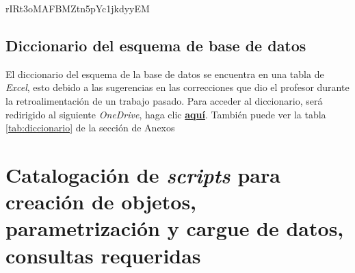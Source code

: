 \documentclass{article}
\begin{document}
rIRt3oMAFBMZtn5pYc1jkdyyEM%




\subsection{Diccionario del esquema de base de datos}
El diccionario del esquema de la base de datos se encuentra en una tabla de \textit{Excel}, esto debido a las sugerencias en las correcciones que dio el profesor durante la retroalimentación de un trabajo pasado. Para acceder al diccionario, será redirigido al siguiente \textit{OneDrive}, haga clic \href{https://utadeoeduco0-my.sharepoint.com/:x:/g/personal/ludwig_alvaradob_utadeo_edu_co/ESnNN_S9m3lLjRuBV98TBJ8BtNiuxTNsBHEWiHHNZ142qQ?e=Mcr9HD}{\textbf{aquí}}. También puede ver la tabla \ref{tab:diccionario} de la sección de Anexos


\newpage
\section{Catalogación de \textit{scripts} para creación de objetos, parametrización y cargue de datos, consultas requeridas}
\end{document}
